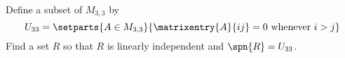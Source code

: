 Define a subset of $M_{3,3}$ by
%
\begin{equation*}
U_{33}=\setparts{
A\in M_{3,3}
}{
\matrixentry{A}{ij}=0\text{ whenever }i>j
}
\end{equation*}
%
Find a set $R$ so that $R$ is linearly independent and $\spn{R}=U_{33}$.